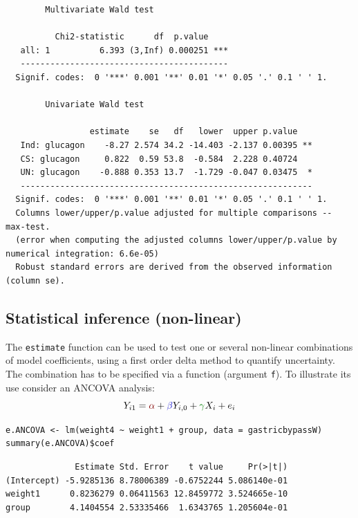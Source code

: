 \documentclass[12pt]{article}
\newcommand{\darkblue}{blue!80!black}
\newcommand{\darkgreen}{green!50!black}
\newcommand{\darkred}{red!50!black}
\begin{document}
\begin{verbatim}
		Multivariate Wald test 

          Chi2-statistic      df  p.value    
   all: 1          6.393 (3,Inf) 0.000251 ***
   ------------------------------------------ 
  Signif. codes:  0 '***' 0.001 '**' 0.01 '*' 0.05 '.' 0.1 ' ' 1.

		Univariate Wald test 

                 estimate    se   df   lower  upper p.value   
   Ind: glucagon    -8.27 2.574 34.2 -14.403 -2.137 0.00395 **
   CS: glucagon     0.822  0.59 53.8  -0.584  2.228 0.40724   
   UN: glucagon    -0.888 0.353 13.7  -1.729 -0.047 0.03475  *
   ----------------------------------------------------------- 
  Signif. codes:  0 '***' 0.001 '**' 0.01 '*' 0.05 '.' 0.1 ' ' 1.
  Columns lower/upper/p.value adjusted for multiple comparisons -- max-test.
  (error when computing the adjusted columns lower/upper/p.value by numerical integration: 6.6e-05)
  Robust standard errors are derived from the observed information (column se).
\end{verbatim}

\clearpage

\subsection{Statistical inference (non-linear)}
\label{sec:org0bbcd84}

The \texttt{estimate} function can be used to test one or several non-linear
combinations of model coefficients, using a first order delta method
to quantify uncertainty. The combination has to be specified via a
function (argument \texttt{f}). To illustrate its use consider an ANCOVA
analysis:
\[ Y_{i1} = \textcolor{\darkred}{\alpha} + \textcolor{\darkblue}{\beta} Y_{i,0} + \textcolor{\darkgreen}{\gamma} X_{i} + e_{i} \]

\lstset{language=r,label= ,caption= ,captionpos=b,numbers=none}
\begin{lstlisting}
e.ANCOVA <- lm(weight4 ~ weight1 + group, data = gastricbypassW)
summary(e.ANCOVA)$coef
\end{lstlisting}

\begin{verbatim}
              Estimate Std. Error    t value     Pr(>|t|)
(Intercept) -5.9285136 8.78006389 -0.6752244 5.086140e-01
weight1      0.8236279 0.06411563 12.8459772 3.524665e-10
group        4.1404554 2.53335466  1.6343765 1.205604e-01
\end{verbatim}
\end{document}

